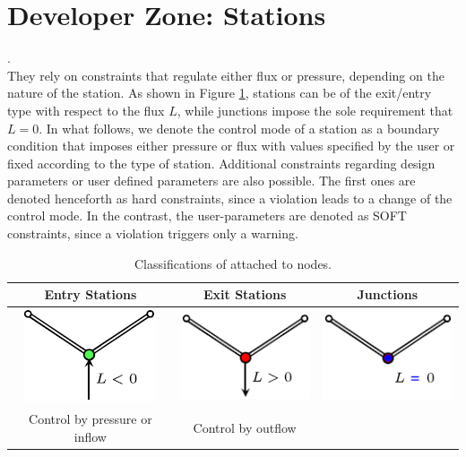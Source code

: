 \section{Developer Zone: Stations}

.\\

They rely on constraints that regulate either flux or pressure, depending on the nature of the station. As shown in Figure \ref{tab: non_pipe_to_node_scheme_table}, stations can be of the exit/entry type with respect to the flux $L$, while junctions impose the sole requirement that $L = 0$. In what follows, we denote the control mode of a station as a boundary condition that imposes either pressure or flux with values specified by the user or fixed according to the type of station.  Additional constraints regarding design parameters or user defined parameters are also possible. The first ones are denoted henceforth as hard constraints, since a violation leads to a change of the control mode. In the contrast, the user-parameters are denoted as SOFT constraints, since a violation triggers only a warning.

\begin{table}[H]
    \centering
    \label{tab: non_pipe_to_node_scheme_table}
    \begin{tabular}{ccc}
    \hline
     Entry Stations    &  Exit Stations   &  Junctions \\ \hline
    \includegraphics[scale= 0.7]{img_memory/entry.png}&  \includegraphics[scale= 0.7]{img_memory/exit.png}   & \includegraphics[scale= 0.7]{img_memory/junction.png} \\ \hline
    Control by pressure or inflow & Control by outflow & \\ \hline
    \end{tabular} 
    
    \caption{Classifications of  attached to nodes.}
\end{table}


